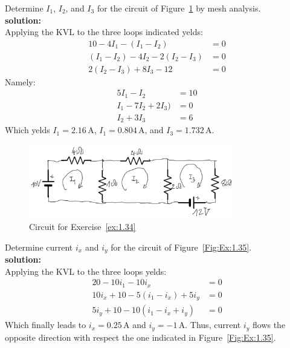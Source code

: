 \begin{exercise}
\label{ex:1.34}
Determine $I_1$, $I_2$, and $I_3$ for the circuit of Figure~\ref{Fig:Ex:1.34} by mesh analysis.\\

\textbf{solution:}\\
Applying the KVL to the three loops indicated yelds:
\begin{equation*}
\begin{split}
10 - 4I_1 - (I_1-I_2) & = 0\\
(I_1 - I_2) - 4I_2 - 2(I_2-I_3) &= 0\\
2(I_2 - I_3) + 8I_3 - 12 &= 0 
\end{split}
\end{equation*}
Namely:
\begin{equation*}
\begin{split}
5I_1 - I_2 & = 10\\
I_1 - 7I_2 + 2I_3) &= 0\\
I_2 + 3I_3 &= 6 
\end{split}
\end{equation*}
Which yelds $I_1 = 2.16\,\textrm{A}$, $I_1 = 0.804\,\textrm{A}$, and $I_3 = 1.732\,\textrm{A}$.
\end{exercise}

\begin{figure}[h!]
  \centering
  \includegraphics[width=0.8\textwidth]{"images/Fig-13"}
  \caption{Circuit for Exercise~\ref{ex:1.34}} 
  \label{Fig:Ex:1.34}
\end{figure}

\begin{exercise}
\label{ex:1.35}
Determine current $i_x$ and $i_y$ for the circuit of Figure~\ref{Fig:Ex:1.35}.\\

\textbf{solution:}\\
Applying the KVL to the three loops yelds:
\begin{equation*}
\begin{split}
20 - 10i_1 -10i_x & = 0\\
10i_x + 10 - 5(i_1-i_x) + 5i_y&= 0\\
5i_y + 10 - 10(i_1 - i_x + i_y) &= 0 
\end{split}
\end{equation*}
Which finally leads to $i_x = 0.25\,\textrm{A}$ and
$i_y = -1\,\textrm{A}$. Thus, current $i_y$ flows the opposite direction with respect the one indicated in Figure~\ref{Fig:Ex:1.35}.
\end{exercise}

